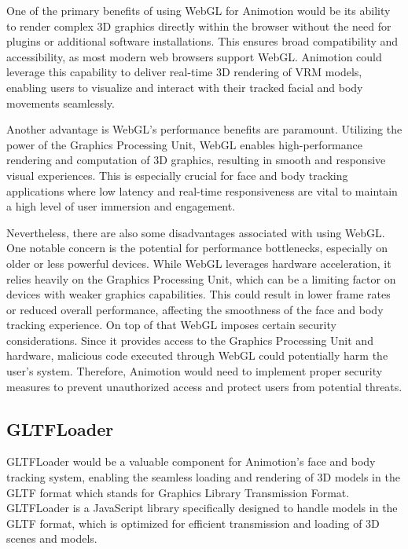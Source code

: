 One of the primary benefits of using WebGL for Animotion would be its ability to render complex 3D graphics directly 
within the browser without the need for plugins or additional software installations. This ensures broad 
compatibility and accessibility, as most modern web browsers support WebGL. Animotion could leverage this 
capability to deliver real-time 3D rendering of VRM models, enabling users to visualize and interact 
with their tracked facial and body movements seamlessly. 

Another advantage is WebGL's performance benefits are paramount. Utilizing the power of the Graphics Processing Unit, WebGL 
enables high-performance rendering and computation of 3D graphics, resulting in smooth and responsive visual 
experiences. This is especially crucial for face and body tracking applications where low latency and real-time 
responsiveness are vital to maintain a high level of user immersion and engagement. \cite{WebGLAdvantages}

Nevertheless, there are also some disadvantages associated with using WebGL. One notable concern is the potential for performance bottlenecks, 
especially on older or less powerful devices. While WebGL leverages hardware acceleration, it relies heavily on the Graphics Processing Unit, 
which can be a limiting factor on devices with weaker graphics capabilities. This could result in lower frame rates or reduced 
overall performance, affecting the smoothness of the face and body tracking experience. 
On top of that WebGL imposes certain security considerations. Since it provides access to the Graphics Processing Unit and hardware, 
malicious code executed through WebGL could potentially harm the user's system. Therefore, 
Animotion would need to implement proper security measures to prevent unauthorized access and protect users from potential threats. \cite{WebGLSecurity}

\subsection{GLTFLoader}
GLTFLoader would be a valuable component for Animotion's face and body tracking system, enabling the seamless loading 
and rendering of 3D models in the GLTF format which stands for Graphics Library Transmission Format. GLTFLoader is a JavaScript library specifically designed to handle 
models in the GLTF format, which is optimized for efficient transmission 
and loading of 3D scenes and models. 

